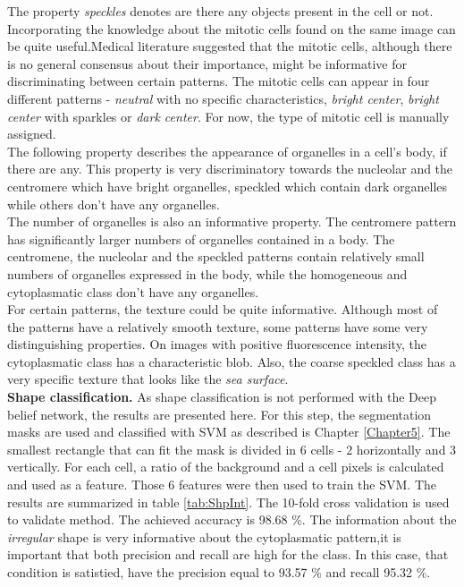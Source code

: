 The property \textit{speckles} denotes are there any objects present in the cell or not. \\

Incorporating the knowledge about the mitotic cells found on the same image can be quite useful.Medical literature suggested that the mitotic cells, although there is no general consensus about their importance, might be informative for discriminating between certain patterns. The mitotic cells can appear in four different patterns - \textit{neutral} with no specific characteristics, \textit{bright center},  \textit{bright center} with sparkles or \textit{dark center}. For now, the type of mitotic cell is manually assigned. \\

The following property describes the appearance of organelles in a cell's body, if there are any. This property is very discriminatory towards the nucleolar and the centromere which have bright organelles, speckled which contain dark organelles while others don't have any organelles. \\

The number of organelles is also an informative property. The centromere pattern has significantly larger numbers of organelles contained in a body. The centromene, the nucleolar and the speckled patterns contain relatively small numbers of organelles expressed in the body, while the homogeneous and cytoplasmatic class don't have any organelles. \\

For certain patterns, the texture could be quite informative. Although most of the patterns have a relatively smooth texture, some patterns have some very distinguishing properties. On images with positive fluorescence intensity, the cytoplasmatic class has a characteristic blob. Also, the coarse speckled class has a very specific texture that looks like the \textit{sea surface}. \\

\textbf{Shape classification.} As shape classification is not performed with the Deep belief network, the results are presented here. For this step, the segmentation masks are used and classified with SVM as described is Chapter \ref{Chapter5}. The smallest rectangle that can fit the mask is divided in 6 cells - 2 horizontally and 3 vertically. For each cell, a ratio of the background and a cell pixels is calculated and used as a feature. Those 6 features were then used to train the SVM. The results are summarized in table \ref{tab:ShpInt}. The 10-fold cross validation is used to validate method. The achieved accuracy is 98.68 \%. The information about the \textit{irregular} shape is very informative about the cytoplasmatic pattern,it is important that both precision and recall are high for the class. In this case, that condition is satistied, have the precision equal to 93.57 \% and recall 95.32 \%.  \\




